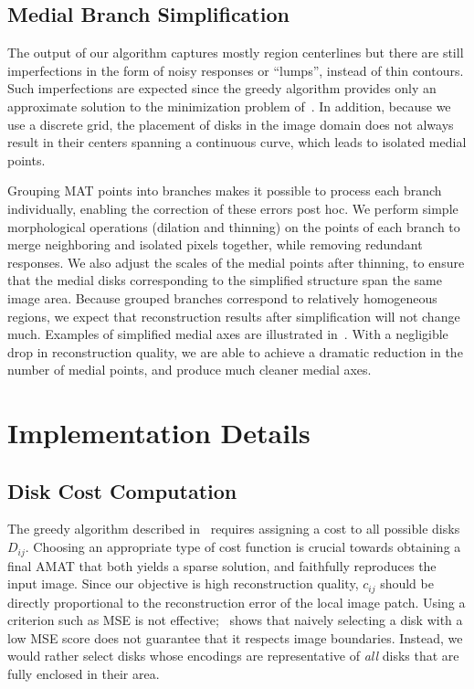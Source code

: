 \documentclass[10pt,twocolumn,letterpaper]{article}
\begin{document}
\subsection{Medial Branch Simplification}\label{sec:method:simplification}
The output of our algorithm captures mostly region centerlines but there are still
imperfections in the form of noisy responses or ``lumps'', instead of thin contours.
Such imperfections are expected since the greedy algorithm provides only an approximate solution
to the minimization problem of~. 
In addition, because we use a discrete grid, the placement of disks 
in the image domain does not always result in their centers spanning a continuous curve, 
which leads to isolated medial points.

Grouping MAT points into branches makes it possible to process each branch individually, enabling
the correction of these errors post hoc.
We perform simple morphological operations (dilation and thinning) 
on the points of each branch to merge neighboring and isolated pixels together, while removing 
redundant responses. 
We also adjust the scales of the medial points after thinning, to ensure that the medial disks corresponding 
to the simplified structure span the same image area.
Because grouped branches correspond to relatively homogeneous regions, we expect that reconstruction
results after simplification will not change much.
Examples of simplified medial axes are illustrated in~.
With a negligible drop in reconstruction quality, we are able to achieve a dramatic reduction
in the number of medial points, and produce much cleaner medial axes.


\section{Implementation Details}\label{sec:implementation}
\subsection{Disk Cost Computation}\label{sec:implementation:diskcost}
The greedy algorithm described in~ requires assigning a cost to all possible disks $D_{ij}$.
Choosing an appropriate type of cost function is crucial towards obtaining a final AMAT that both 
yields a sparse solution, and faithfully reproduces the input image.
Since our objective is high reconstruction quality, $c_{ij}$ should be directly proportional
to the reconstruction error of the local image patch.
Using a criterion such as MSE is not effective;~ shows that naively selecting a disk with 
a low MSE score does not guarantee that it respects image boundaries.
Instead, we would rather select disks whose encodings are representative of \emph{all} disks that are fully enclosed
in their area. 
\end{document}
